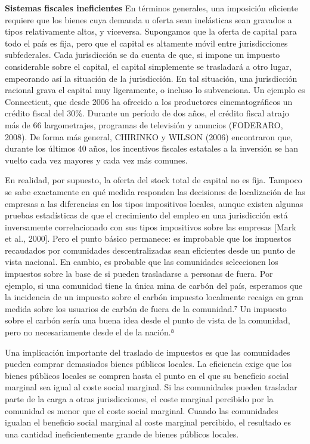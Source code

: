 \documentclass[10pt,a4paper]{article}
\begin{document}
\textbf{Sistemas fiscales ineficientes }
En términos generales, una imposición eficiente requiere que los bienes cuya demanda u oferta sean inelásticas sean gravados a tipos relativamente altos, y viceversa. Supongamos que la oferta de capital para todo el país es fija, pero que el capital es altamente móvil entre jurisdicciones subfederales. Cada jurisdicción se da cuenta de que, si impone un impuesto considerable sobre el capital, el capital simplemente se trasladará a otro lugar, empeorando así la situación de la jurisdicción. En tal situación, una jurisdicción racional grava el capital muy ligeramente, o incluso lo subvenciona. Un ejemplo es Connecticut, que desde 2006 ha ofrecido a los productores cinematográficos un crédito fiscal del 30\%. Durante un período de dos años, el crédito fiscal atrajo más de 66 largometrajes, programas de televisión y anuncios (FODERARO, 2008). De forma más general, CHIRINKO y WILSON (2006) encontraron que, durante los últimos 40 años, los incentivos fiscales estatales a la inversión se han vuelto cada vez mayores y cada vez más comunes.

En realidad, por supuesto, la oferta del stock total de capital no es fija. Tampoco se sabe exactamente en qué medida responden las decisiones de localización de las empresas a las diferencias en los tipos impositivos locales, aunque existen algunas pruebas estadísticas de que el crecimiento del empleo en una jurisdicción está inversamente correlacionado con sus tipos impositivos sobre las empresas [Mark et al., 2000]. Pero el punto básico permanece: es improbable que los impuestos recaudados por comunidades descentralizadas sean eficientes desde un punto de vista nacional. En cambio, es probable que las comunidades seleccionen los impuestos sobre la base de si pueden trasladarse a personas de fuera. Por ejemplo, si una comunidad tiene la única mina de carbón del país, esperamos que la incidencia de un impuesto sobre el carbón impuesto localmente recaiga en gran medida sobre los usuarios de carbón de fuera de la comunidad.⁷ Un impuesto sobre el carbón sería una buena idea desde el punto de vista de la comunidad, pero no necesariamente desde el de la nación.⁸

Una implicación importante del traslado de impuestos es que las comunidades pueden comprar demasiados bienes públicos locales. La eficiencia exige que los bienes públicos locales se compren hasta el punto en el que su beneficio social marginal sea igual al coste social marginal. Si las comunidades pueden trasladar parte de la carga a otras jurisdicciones, el coste marginal percibido por la comunidad es menor que el coste social marginal. Cuando las comunidades igualan el beneficio social marginal al coste marginal percibido, el resultado es una cantidad ineficientemente grande de bienes públicos locales.
\end{document}

